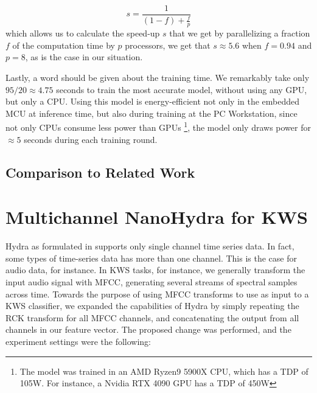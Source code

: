 \begin{equation}
s = \frac{1}{(1-f) + \frac{f}{p}}
\end{equation}
which allows us to calculate the speed-up $s$ that we get by parallelizing a fraction $f$ of the computation time by $p$ processors,
we get that $s \approx 5.6$ when $f=0.94$ and $p=8$, as is the case in our situation.

Lastly, a word should be given about the training time. We remarkably take only $95 / 20 \approx 4.75$ seconds to train the most accurate model, without using any GPU, but only a CPU.
Using this model is energy-efficient not only in the embedded MCU at inference time, but also during training at the PC Workstation, since not only CPUs consume less power than GPUs
\footnote{The model was trained in an AMD Ryzen9 5900X CPU, which has a TDP of 105W. For instance, a Nvidia RTX 4090 GPU has a TDP of 450W}, the model only draws power for $\approx5$ seconds during each training round. 

\subsection{Comparison to Related Work}

\section{Multichannel NanoHydra for KWS}\label{sec:rs_speechcomms}
Hydra as formulated in \cite{Dempster2023Hydra} supports only single channel time series data.
In fact, some types of time-series data has more than one channel. This is the case for audio data, for instance.
In KWS tasks, for instance, we generally transform the input audio signal with MFCC, generating several streams of spectral samples across time.
Towards the purpose of using MFCC transforms to use as input to a KWS classifier, we expanded the capabilities of Hydra by simply
repeating the RCK transform for all MFCC channels, and concatenating the output from all channels in our feature vector.
The proposed change was performed, and the experiment settings were the following:

